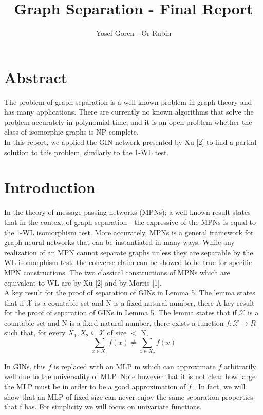 \documentclass{article}
\begin{document}
\author{Yosef Goren - Or Rubin}
\title{Graph Separation - Final Report}
\maketitle
\part*{Abstract}
The problem of graph separation is a well known problem in graph theory and has many applications.
There are currently no known algorithms that solve the problem accurately in polynomial time, and it is an open
problem whether the class of isomorphic graphs is NP-complete.\\
In this report, we applied the GIN network presented by Xu [2] to find a partial solution to this problem, 
similarly to the 1-WL test.


\part*{Introduction}
In the theory of message passing networks (MPNs); a well known result states 
that in the context of graph separation - the expressive of the MPNs is equal to the 1-WL isomorphism test.
More accurately, MPNs is a general framework for graph neural networks that can be
instantiated in many ways. While any realization of an MPN cannot separate
graphs unless they are separable by the WL isomorphism test, the converse
claim can be showed to be true for specific MPN constructions. The two classical
constructions of MPNs which are equivalent to WL are by Xu [2] and by
Morris [1].\\

A key result for the proof of separation of GINs in Lemma 5. The lemma
states that if $\mathcal{X}$ is a countable set and N is a fixed natural number, there
A key result for the proof of separation of GINs in Lemma 5. The lemma
states that if $\mathcal{X}$ is a countable set and N is a fixed natural number, there
exists a function $f : \mathcal{X} \rightarrow R$ such that, for every $X_1, X_2 \subseteq \mathcal{X}$
of size $<$ N,
\[
    \sum_{x\in X_1}f(x) \neq \sum_{x\in X_2}f(x)
\]

In GINs, this $f$ is replaced with an MLP m which can approximate $f$
arbitrarily well due to the universality of MLP. Note however that it is
not clear how large the MLP must be in order to be a good approximation
of $f$ . In fact, we will show that an MLP of fixed size can never enjoy the
same separation properties that f has. For simplicity we will focus on
univariate functions.
\end{document}
